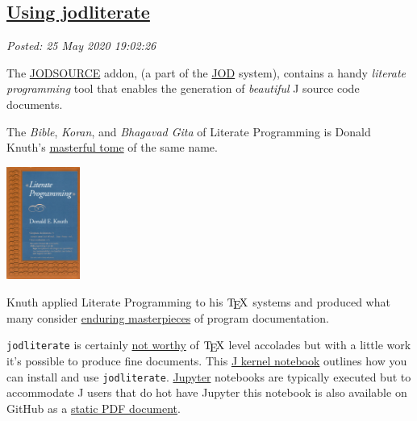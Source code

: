 %

\subsection*{\href{http://analyzethedatanotthedrivel.org/2020/05/25/using-jodliterate/}{Using jodliterate}}

\noindent\emph{Posted: 25 May 2020 19:02:26}
\vspace{6pt}

The
\href{https://code.jsoftware.com/wiki/Addons/general/jodsource}{JODSOURCE}
addon, (a part of the
\href{https://code.jsoftware.com/wiki/Addons/general/jod}{JOD} system),
contains a handy \emph{literate programming} tool that enables the
generation of \emph{beautiful} J source code documents.

The \emph{Bible}, \emph{Koran}, and \emph{Bhagavad Gita} of Literate
Programming is Donald Knuth's
\href{https://www.goodreads.com/book/show/112245.Literate_Programming}{masterful
tome} of the same name.


\captionsetup[floatingfigure]{labelformat=empty}
\begin{floatingfigure}[l]{0.22\textwidth}
\centering
\includegraphics[width=0.18\textwidth]{inclusions/literate_programming_book_cover_smaller.png}
\end{floatingfigure}Knuth applied Literate Programming to his \(\TeX\) systems and produced
what many consider
\href{https://www.amazon.com/TeXbook-Donald-Knuth/dp/0201134489\#customerReviews}{enduring
masterpieces} of program documentation.

\texttt{jodliterate} is certainly
\href{https://www.youtube.com/watch?v=o5FT3IGXtAk}{not worthy} of
\(\TeX\) level accolades but with a little work it's possible to produce
fine documents. This \href{https://github.com/martin-saurer/jkernel}{J
kernel notebook} outlines how you can install and use
\texttt{jodliterate}. \href{https://jupyter.org/}{Jupyter} notebooks are
typically executed but to accommodate J users that do hot have Jupyter
this notebook is also available on GitHub as a
\href{https://github.com/bakerjd99/jacks/blob/master/jodliterate/UsingJodliterate.pdf}{static
PDF document}.

